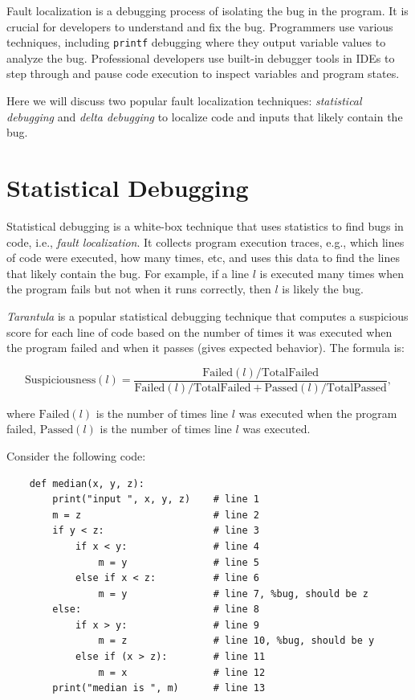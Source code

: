 \documentclass[oneside,11pt,dvipsnames]{book}
\newenvironment{centerdisplay}[1][]{
  \small
  \centering
  \begin{mycenterdisplay}
    {\small \textbf{#1}}
  }{
  \end{mycenterdisplay}
}
\newcommand{\code}[1]{\texttt{#1}}
\begin{document}
Fault localization is a debugging process of isolating the bug in the program. It is crucial for developers to understand and fix the bug. Programmers use various techniques, including \code{printf} debugging where they output variable values to analyze the bug. Professional developers use built-in debugger tools in IDEs to step through and pause code execution to inspect variables and program states.  

Here we will discuss two popular fault localization techniques: \emph{statistical debugging} and \emph{delta debugging} to localize code and inputs that likely contain the bug.


\section{Statistical Debugging}\label{sec:statistical-debugging}
Statistical debugging is a white-box technique that uses statistics to find bugs in code, i.e., \emph{fault localization}. It collects program execution traces, e.g., which lines of code were executed, how many times, etc, and uses this data to find the lines that likely contain the bug. For example, if a line $l$ is executed many times when the program fails but not when it runs correctly, then $l$ is likely the bug.

\emph{Tarantula} is a popular statistical debugging technique that computes a suspicious score for each line of code based on the number of times it was executed when the program failed and when it passes (gives expected behavior). The formula is:

\begin{centerdisplay}
\[
\text{Suspiciousness}(l) = \frac{\text{Failed}(l) / \text{TotalFailed}}{\text{Failed}(l) / \text{TotalFailed} + \text{Passed}(l) / \text{TotalPassed}},
\] 
\end{centerdisplay}
\noindent where $\text{Failed}(l)$ is the number of times line $l$ was executed when the program failed, $\text{Passed}(l)$ is the number of times line $l$ was executed.  

Consider the following code:
\begin{lstlisting}
    def median(x, y, z):
        print("input ", x, y, z)    # line 1
        m = z                       # line 2
        if y < z:                   # line 3
            if x < y:               # line 4
                m = y               # line 5
            else if x < z:          # line 6
                m = y               # line 7, %bug, should be z
        else:                       # line 8
            if x > y:               # line 9
                m = z               # line 10, %bug, should be y
            else if (x > z):        # line 11
                m = x               # line 12 
        print("median is ", m)      # line 13
\end{lstlisting}
\end{document}
